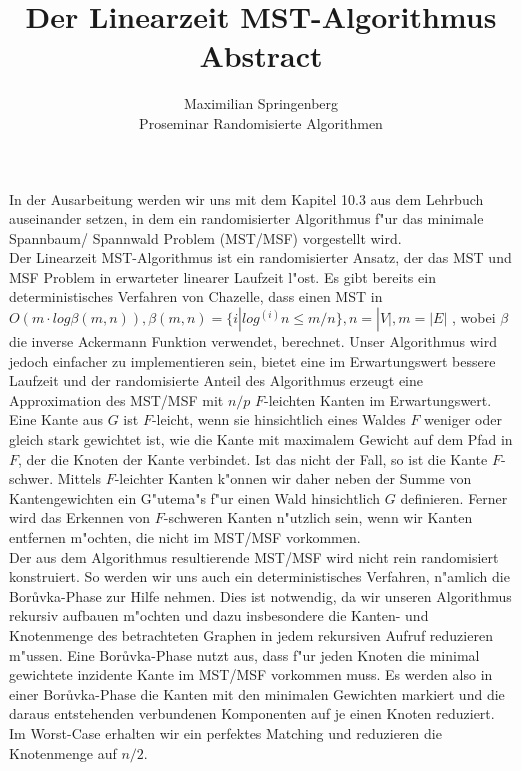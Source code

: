\documentclass[a4paper,12pt,times,german]{cls/summary}
\title{Der Linearzeit MST-Algorithmus\\
       \LARGE Abstract}
\author{Maximilian Springenberg\\
        \small Proseminar Randomisierte Algorithmen}
\date{}
\begin{document}
\maketitle
In der Ausarbeitung werden wir uns mit dem Kapitel 10.3 aus dem Lehrbuch 
    \cite{randAlg} auseinander
    setzen, in dem ein randomisierter Algorithmus f"ur das minimale Spannbaum/
    Spannwald Problem (MST/MSF) vorgestellt wird.\\
Der Linearzeit MST-Algorithmus ist ein randomisierter Ansatz, der das MST und MSF
    Problem in erwarteter linearer Laufzeit l"ost.
    Es gibt bereits ein deterministisches Verfahren von Chazelle, dass einen MST in
    $O(m \cdot log \beta(m,n)), \beta(m,n) = \{i | log^{(i)} n \leq m / n\}, n = |V|, m = |E|$
    , wobei $\beta$ die inverse Ackermann Funktion verwendet, berechnet.
    Unser Algorithmus wird jedoch einfacher zu implementieren sein, bietet eine
    im Erwartungswert bessere Laufzeit und der randomisierte Anteil des 
    Algorithmus erzeugt eine Approximation des MST/MSF mit 
    $n/p$ $F$-leichten Kanten im Erwartungswert.\\
Eine Kante aus $G$ ist $F$-leicht, wenn sie hinsichtlich eines Waldes $F$ 
    weniger oder gleich stark
    gewichtet ist, wie die Kante mit maximalem Gewicht auf dem Pfad in $F$,
    der die Knoten der Kante verbindet. 
    Ist das nicht der Fall, so ist die Kante $F$-schwer.
    Mittels $F$-leichter Kanten k"onnen wir daher neben der Summe von Kantengewichten
    ein G"utema"s f"ur einen Wald hinsichtlich $G$ definieren.
    Ferner wird das Erkennen von $F$-schweren Kanten n"utzlich sein, wenn wir
    Kanten entfernen m"ochten, die nicht im MST/MSF vorkommen.\\
Der aus dem Algorithmus resultierende MST/MSF wird nicht rein randomisiert 
    konstruiert. 
    So werden wir uns auch ein deterministisches Verfahren, n"amlich die
    Bor\r uvka-Phase zur Hilfe nehmen.
    Dies ist notwendig, da wir unseren Algorithmus rekursiv
    aufbauen m"ochten und dazu insbesondere die Kanten- und Knotenmenge des
    betrachteten Graphen in jedem rekursiven Aufruf reduzieren m"ussen.
    Eine Bor\r uvka-Phase nutzt aus, dass f"ur jeden Knoten die minimal gewichtete
    inzidente Kante im MST/MSF vorkommen muss. 
    Es werden also in einer Bor\r uvka-Phase die Kanten mit den minimalen Gewichten
    markiert und die 
    daraus entstehenden verbundenen Komponenten auf je einen Knoten reduziert.
    Im Worst-Case erhalten wir ein perfektes Matching und reduzieren die 
    Knotenmenge auf $n/2$.\\
\end{document}
